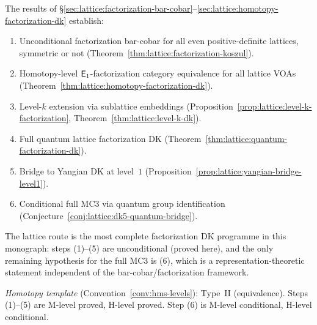 \begin{remark}
\label{rem:lattice:dk-summary}
The results of \S\ref{sec:lattice:factorization-bar-cobar}--\ref{sec:lattice:homotopy-factorization-dk} establish:
\begin{enumerate}[label=\textup{(\arabic*)}]
\item Unconditional factorization bar-cobar for all even
  positive-definite lattices, symmetric or not
  (Theorem~\ref{thm:lattice:factorization-koszul}).
\item Homotopy-level $\mathsf{E}_1$-factorization category equivalence
  for all lattice VOAs
  (Theorem~\ref{thm:lattice:homotopy-factorization-dk}).
\item Level-$k$ extension via sublattice embeddings
  (Proposition~\ref{prop:lattice:level-k-factorization},
  Theorem~\ref{thm:lattice:level-k-dk}).
\item Full quantum lattice factorization DK
  (Theorem~\ref{thm:lattice:quantum-factorization-dk}).
\item Bridge to Yangian DK at level~$1$
  (Proposition~\ref{prop:lattice:yangian-bridge-level1}).
\item Conditional full MC3 via quantum group identification
  (Conjecture~\ref{conj:lattice:dk5-quantum-bridge}).
\end{enumerate}
The lattice route is the most complete factorization DK programme
in this monograph: steps (1)--(5) are unconditional (proved here),
and the only remaining hypothesis for the full MC3 is (6), which
is a representation-theoretic statement independent of the
bar-cobar/factorization framework.

\emph{Homotopy template}
(Convention~\ref{conv:hms-levels}): Type~II (equivalence).
Steps (1)--(5) are M-level proved, H-level proved.  Step (6) is
M-level conditional, H-level conditional.
\end{remark}
